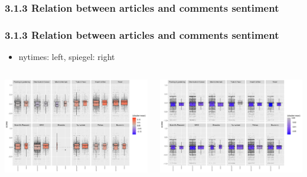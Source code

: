 \documentclass{tum-presentation}
\begin{document}
\subsubsection{3.1.3 Relation between articles and comments sentiment }
\begin{frame}
  \frametitle{3.1.3 Relation between articles and comments sentiment}
  \begin{itemize}
    \item nytimes: left, spiegel: right
 
 \end{itemize}
  \begin{columns}
    \begin{minipage}[c]{\linewidth}
        \centering
        \includegraphics[width=0.95\linewidth]{figures/all_boxplot_combinedall_sentiments_nytimes_news.pdf}
    \end{minipage}
    \begin{minipage}[c]{\linewidth}
        \centering
        \includegraphics[width=0.95\linewidth]{figures/all_boxplot_combinedall_sentiments_spiegel_news.pdf}
    \end{minipage}
\end{columns}
\end{frame}
\end{document}
